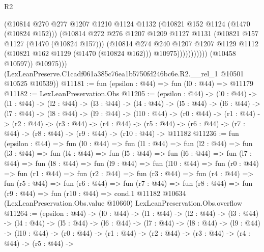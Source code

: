 \begin{lexlean}{R2}
\begin{coremodule}
                              (@10814
                                @270
                                @277
                                @1207
                                @1210
                                @1124
                                @1132
                                (@10821 @152 @1124 (@1470 (@10824 @152)))
                                (@10814
                                  @272
                                  @276
                                  @1207
                                  @1209
                                  @1127
                                  @1131
                                  (@10821 @157 @1127 (@1470 (@10824 @157)))
                                  (@10814
                                    @274
                                    @240
                                    @1207
                                    @1207
                                    @1129
                                    @1112
                                    (@10821 @162 @1129 (@1470 (@10824 @162)))
                                    @10975)))))))))))
              (@10458 @10597))
            @10975)))
      (LexLeanPreserve.C1cadf061a385c76ea1b5750fd246bc6e.R2.__rel_1 @10501 @10525 @10539))
@11181 := fun (epsilon : @44) => fun (l0 : @44) => @11179
@11182 := LexLeanPreservation.Obs
@11205 := (epsilon : @44) ->
  (l0 : @44) ->
  (l1 : @44) ->
  (l2 : @44) ->
  (l3 : @44) ->
  (l4 : @44) ->
  (l5 : @44) ->
  (l6 : @44) ->
  (l7 : @44) ->
  (l8 : @44) ->
  (l9 : @44) ->
  (l10 : @44) ->
  (r0 : @44) ->
  (r1 : @44) ->
  (r2 : @44) ->
  (r3 : @44) ->
  (r4 : @44) ->
  (r5 : @44) -> (r6 : @44) -> (r7 : @44) -> (r8 : @44) -> (r9 : @44) -> (r10 : @44) -> @11182
@11236 := fun (epsilon : @44) =>
  fun (l0 : @44) =>
  fun (l1 : @44) =>
  fun (l2 : @44) =>
  fun (l3 : @44) =>
  fun (l4 : @44) =>
  fun (l5 : @44) =>
  fun (l6 : @44) =>
  fun (l7 : @44) =>
  fun (l8 : @44) =>
  fun (l9 : @44) =>
  fun (l10 : @44) =>
  fun (r0 : @44) =>
  fun (r1 : @44) =>
  fun (r2 : @44) =>
  fun (r3 : @44) =>
  fun (r4 : @44) =>
  fun (r5 : @44) =>
  fun (r6 : @44) =>
  fun (r7 : @44) =>
  fun (r8 : @44) =>
  fun (r9 : @44) =>
  fun (r10 : @44) =>
  cond.{1} @11182 @10634 (LexLeanPreservation.Obs.value @10660) LexLeanPreservation.Obs.overflow
@11264 := (epsilon : @44) ->
  (l0 : @44) ->
  (l1 : @44) ->
  (l2 : @44) ->
  (l3 : @44) ->
  (l4 : @44) ->
  (l5 : @44) ->
  (l6 : @44) ->
  (l7 : @44) ->
  (l8 : @44) ->
  (l9 : @44) ->
  (l10 : @44) ->
  (r0 : @44) ->
  (r1 : @44) ->
  (r2 : @44) ->
  (r3 : @44) ->
  (r4 : @44) ->
  (r5 : @44) ->

\end{coremodule}
\end{lexlean}
